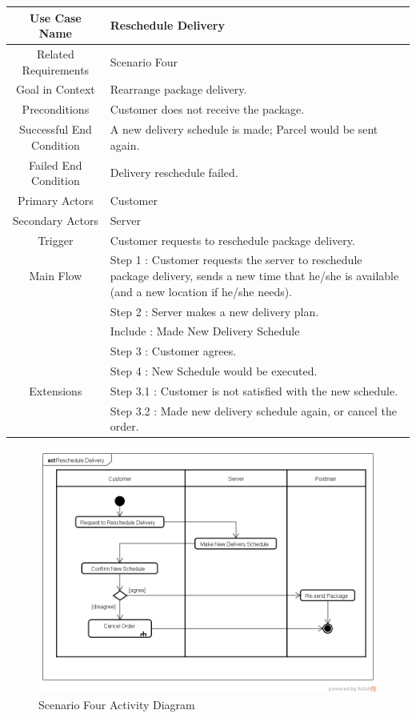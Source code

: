 \documentclass[12pt]{scrreprt}
\begin{document}
\begin{table}
  \centering
  \begin{tabular}{| c | p{11cm} |}
    \hline
    Use Case Name & Reschedule Delivery\\
    \hline
    Related Requirements & Scenario Four\\
    \hline
    Goal in Context & Rearrange package delivery.\\
    \hline
    Preconditions & Customer does not receive the package.\\
    \hline
    Successful End Condition & A new delivery schedule is made; Parcel would
    be sent again.\\
    \hline
    Failed End Condition & Delivery reschedule failed.\\
    \hline
    Primary Actors & Customer\\
    \hline
    Secondary Actors & Server\\
    \hline
    Trigger & Customer requests to reschedule package delivery.\\
    \hline
    Main Flow & Step 1 : Customer requests the server to reschedule package
    delivery, sends a new time that he/she is available (and a new location if
    he/she needs).\\
    & Step 2 : Server makes a new delivery plan.\\
    & Include : Made New Delivery Schedule\\
    & Step 3 : Customer agrees.\\
    & Step 4 : New Schedule would be executed.\\
    \hline
    Extensions & Step 3.1 : Customer is not satisfied with the new schedule.\\
    & Step 3.2 : Made new delivery schedule again, or cancel the order.\\
    \hline
  \end{tabular}
\end{table}

\begin{figure}[H]
  \centering\includegraphics[width=5in]{DocumentRes/4RescheduleDelivery.png}
  \caption{Scenario Four Activity Diagram}
\end{figure}
\end{document}
